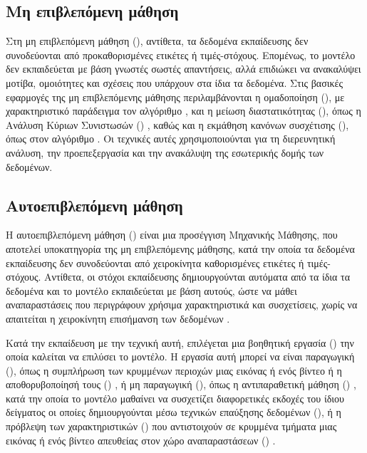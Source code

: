 \subsection{Μη επιβλεπόμενη μάθηση}
\label{subsec:unsupervised-learning}

Στη μη επιβλεπόμενη μάθηση (), αντίθετα, τα
δεδομένα εκπαίδευσης δεν συνοδεύονται από προκαθορισμένες ετικέτες ή
τιμές-στόχους. Επομένως, το μοντέλο δεν εκπαιδεύεται με βάση γνωστές σωστές
απαντήσεις, αλλά επιδιώκει να ανακαλύψει μοτίβα, ομοιότητες και σχέσεις που
υπάρχουν στα ίδια τα δεδομένα. Στις βασικές εφαρμογές της μη επιβλεπόμενης μάθησης περιλαμβάνονται η
ομαδοποίηση (), με χαρακτηριστικό παράδειγμα τον αλγόριθμο
, και η μείωση διαστατικότητας (),
όπως η Ανάλυση Κύριων Συνιστωσών ()
\cite{bishop2006pattern}, καθώς και η εκμάθηση κανόνων συσχέτισης
(), όπως στον αλγόριθμο . Οι τεχνικές αυτές χρησιμοποιούνται για τη
διερευνητική ανάλυση, την προεπεξεργασία και την ανακάλυψη της εσωτερικής
δομής των δεδομένων.

\subsection{Αυτοεπιβλεπόμενη μάθηση}
\label{subsec:self-supervised-pre-training}

Η αυτοεπιβλεπόμενη μάθηση
() είναι μια προσέγγιση Μηχανικής
Μάθησης, που αποτελεί υποκατηγορία της μη επιβλεπόμενης μάθησης, κατά την οποία τα δεδομένα
εκπαίδευσης δεν συνοδεύονται από χειροκίνητα καθορισμένες ετικέτες ή
τιμές-στόχους. Αντίθετα, οι στόχοι εκπαίδευσης δημιουργούνται αυτόματα από
τα ίδια τα δεδομένα και το μοντέλο εκπαιδεύεται με βάση αυτούς, ώστε να
μάθει αναπαραστάσεις που περιγράφουν χρήσιμα χαρακτηριστικά και συσχετίσεις,
χωρίς να απαιτείται η χειροκίνητη επισήμανση των δεδομένων
\cite{balestriero2023cookbook}.

Κατά την εκπαίδευση με την τεχνική αυτή, επιλέγεται μια βοηθητική εργασία
() την οποία καλείται να επιλύσει το μοντέλο. Η εργασία
αυτή μπορεί να είναι παραγωγική (), όπως η συμπλήρωση των
κρυμμένων περιοχών μιας εικόνας ή ενός βίντεο
\cite{he2022masked, wang2023videomaev2} ή η αποθορυβοποίησή τους
() \cite{chen2025deconstructing}, ή μη παραγωγική
(), όπως η αντιπαραθετική μάθηση () \cite{chen2020simple}, κατά την οποία το μοντέλο μαθαίνει να
συσχετίζει διαφορετικές εκδοχές του ίδιου δείγματος οι οποίες
δημιουργούνται μέσω τεχνικών επαύξησης δεδομένων (),
ή η πρόβλεψη των χαρακτηριστικών () που αντιστοιχούν σε
κρυμμένα τμήματα μιας εικόνας ή ενός βίντεο απευθείας στον χώρο
αναπαραστάσεων ()
\cite{mahmoud2023i-jepa, adrien2023v-jepa}.

